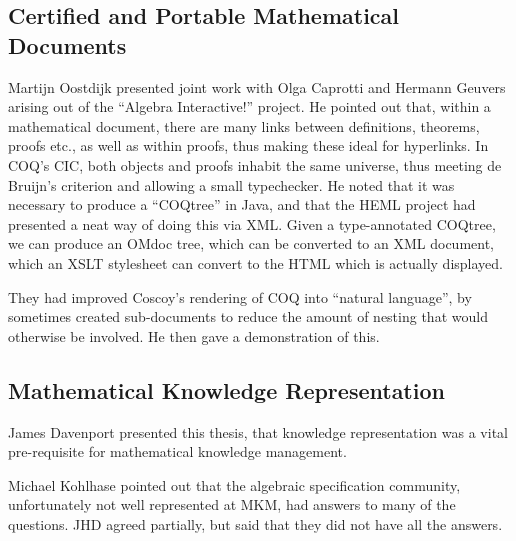 \documentclass[11pt, a4paper]{article}
\begin{document}
\subsection{Certified and Portable Mathematical Documents}
Martijn Oostdijk presented joint work with Olga Caprotti and Hermann
Geuvers arising out of the ``Algebra Interactive!'' project.  He pointed
out that, within a mathematical document, there are many links between
definitions, theorems, proofs etc., as well as within proofs, thus making
these ideal for hyperlinks. In COQ's CIC, both objects and proofs inhabit
the same universe, thus meeting de Bruijn's criterion and allowing a small
typechecker. He noted that it was necessary to produce a ``COQtree'' in
Java, and that the HEML  project had presented a neat way of doing this via
XML. Given a type-annotated COQtree, we can produce an OMdoc tree, which
can be converted to an XML document, which an XSLT stylesheet can convert
to the HTML which is actually displayed.
\par
They had improved Coscoy's rendering of COQ into ``natural language'', by
sometimes created sub-documents to reduce the amount of nesting that would
otherwise be involved. He then gave a demonstration of this.
\subsection{Mathematical Knowledge Representation}
James Davenport presented this thesis, that knowledge representation was a
vital pre-requisite for mathematical knowledge management.
\par
Michael Kohlhase pointed out that the algebraic specification community,
unfortunately not well represented at MKM, had answers to many of the
questions. JHD agreed partially, but said that they did not have all the
answers.
\end{document}
